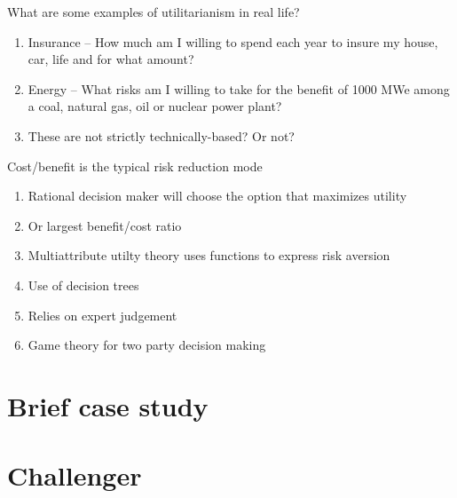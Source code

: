 \documentclass[aspectratio=1610,pdftex,dvipsnames,compress,xcolor={dvipsnames}]{beamer}
\begin{document}
\begin{frame}{What are some examples of utilitarianism in real life?}
    \begin{enumerate}[series=outerlist,topsep=0pt,itemsep=21pt,leftmargin=*,label=(\arabic*)]
        \item[]Insurance -- How much am I willing to spend each year to insure my house, car, life and for what amount?
        \item[]Energy -- What risks am I willing to take for the benefit of 1000 MWe among a coal, natural gas, oil or nuclear power plant?
        \item[]These are not strictly technically-based? Or not?
    \end{enumerate}
\end{frame}


\begin{frame}{Cost/benefit is the typical risk reduction mode}
    \begin{enumerate}[series=outerlist,topsep=0pt,itemsep=21pt,leftmargin=*,label=(\arabic*)]
        \item[]Rational decision maker will choose the option that maximizes utility
        \item[]Or largest benefit/cost ratio
        \item[]Multiattribute utilty theory uses functions to express risk aversion
        \item[]Use of decision trees
        \item[]Relies on expert judgement
        \item[]Game theory for two party decision making
    \end{enumerate}
\end{frame}


\section{Brief case study}


\section{Challenger}
\end{document}
